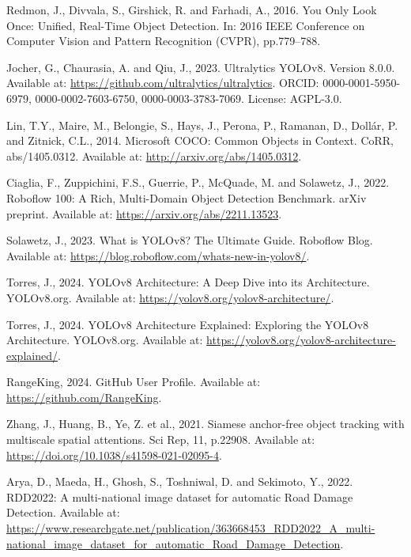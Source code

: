 \begin{thebibliography}{99}
        Redmon, J., Divvala, S., Girshick, R. and Farhadi, A., 2016. You Only Look Once: Unified, Real-Time Object Detection. In: 2016 IEEE Conference on Computer Vision and Pattern Recognition (CVPR), pp.779–788.

        Jocher, G., Chaurasia, A. and Qiu, J., 2023. Ultralytics YOLOv8. Version 8.0.0. Available at: \url{https://github.com/ultralytics/ultralytics}. ORCID: 0000-0001-5950-6979, 0000-0002-7603-6750, 0000-0003-3783-7069. License: AGPL-3.0.

        Lin, T.Y., Maire, M., Belongie, S., Hays, J., Perona, P., Ramanan, D., Dollár, P. and Zitnick, C.L., 2014. Microsoft COCO: Common Objects in Context. CoRR, abs/1405.0312. Available at: \url{http://arxiv.org/abs/1405.0312}.

        Ciaglia, F., Zuppichini, F.S., Guerrie, P., McQuade, M. and Solawetz, J., 2022. Roboflow 100: A Rich, Multi-Domain Object Detection Benchmark. arXiv preprint. Available at: \url{https://arxiv.org/abs/2211.13523}.

        Solawetz, J., 2023. What is YOLOv8? The Ultimate Guide. Roboflow Blog. Available at: \url{https://blog.roboflow.com/whats-new-in-yolov8/}.

        Torres, J., 2024. YOLOv8 Architecture: A Deep Dive into its Architecture. YOLOv8.org. Available at: \url{https://yolov8.org/yolov8-architecture/}.

        Torres, J., 2024. YOLOv8 Architecture Explained: Exploring the YOLOv8 Architecture. YOLOv8.org. Available at: \url{https://yolov8.org/yolov8-architecture-explained/}.

        RangeKing, 2024. GitHub User Profile. Available at: \url{https://github.com/RangeKing}.

        Zhang, J., Huang, B., Ye, Z. et al., 2021. Siamese anchor-free object tracking with multiscale spatial attentions. Sci Rep, 11, p.22908. Available at: \url{https://doi.org/10.1038/s41598-021-02095-4}.

        Arya, D., Maeda, H., Ghosh, S., Toshniwal, D. and Sekimoto, Y., 2022. RDD2022: A multi-national image dataset for automatic Road Damage Detection. Available at: \url{https://www.researchgate.net/publication/363668453_RDD2022_A_multi-national_image_dataset_for_automatic_Road_Damage_Detection}.


\end{thebibliography}
